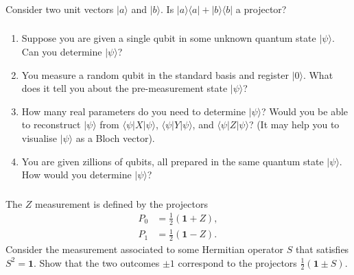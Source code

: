 \documentclass[fleqn]{article}
\begin{document}
\hypertarget{section-23}{%
\subsubsection{}\label{section-23}}

Consider two unit vectors \(|a\rangle\) and \(|b\rangle\).
Is \(|a\rangle\langle a|+|b\rangle\langle b|\) a projector?

\hypertarget{section-24}{%
\subsubsection{}\label{section-24}}

\begin{enumerate}
\def\labelenumi{\arabic{enumi}.}
\item
  Suppose you are given a single qubit in some unknown quantum state \(|\psi\rangle\).
  Can you determine \(|\psi\rangle\)?
\item
  You measure a random qubit in the standard basis and register \(|0\rangle\).
  What does it tell you about the pre-measurement state \(|\psi\rangle\)?
\item
  How many real parameters do you need to determine \(|\psi\rangle\)?
  Would you be able to reconstruct \(|\psi\rangle\) from \(\langle\psi|X|\psi\rangle\), \(\langle\psi|Y|\psi\rangle\), and \(\langle\psi|Z|\psi\rangle\)?
  (It may help you to visualise \(|\psi\rangle\) as a Bloch vector).
\item
  You are given zillions of qubits, all prepared in the same quantum state \(|\psi\rangle\).
  How would you determine \(|\psi\rangle\)?
\end{enumerate}

\hypertarget{section-25}{%
\subsubsection{}\label{section-25}}

The \(Z\) measurement is defined by the projectors
\[
  \begin{aligned}
    P_0 &= \frac12(\mathbf{1}+ Z),
  \\P_1 &= \frac12(\mathbf{1}- Z).
  \end{aligned}
\]
Consider the measurement associated to some Hermitian operator \(S\) that satisfies \(S^2=\mathbf{1}\).
Show that the two outcomes \(\pm 1\) correspond to the projectors \(\frac12(\mathbf{1}\pm S)\).

\hypertarget{section-26}{%
\subsubsection{}\label{section-26}}
\end{document}
